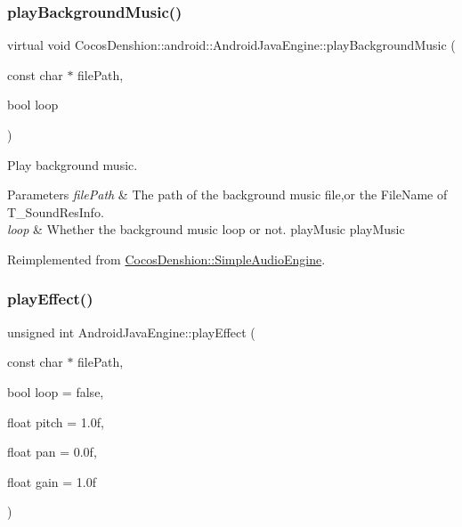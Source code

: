 \subsubsection{\texorpdfstring{play\+Background\+Music()}{playBackgroundMusic()}\hspace{0.1cm}{\footnotesize\ttfamily [2/2]}}
{\footnotesize\ttfamily virtual void Cocos\+Denshion\+::android\+::\+Android\+Java\+Engine\+::play\+Background\+Music (\begin{DoxyParamCaption}\item[{const char $\ast$}]{file\+Path,  }\item[{bool}]{loop }\end{DoxyParamCaption})\hspace{0.3cm}{\ttfamily [virtual]}}

Play background music.


\begin{DoxyParams}{Parameters}
{\em file\+Path} & The path of the background music file,or the File\+Name of T\+\_\+\+Sound\+Res\+Info. \\
\hline
{\em loop} & Whether the background music loop or not.  play\+Music  play\+Music \\
\hline
\end{DoxyParams}


Reimplemented from \hyperlink{classCocosDenshion_1_1SimpleAudioEngine_a579246d2298b943adf49a2c4faaf25ea}{Cocos\+Denshion\+::\+Simple\+Audio\+Engine}.

\mbox{\label{classCocosDenshion_1_1android_1_1AndroidJavaEngine_afbff85587cb49beee14ea5814209ca58}} 
\subsubsection{\texorpdfstring{play\+Effect()}{playEffect()}\hspace{0.1cm}{\footnotesize\ttfamily [1/2]}}
{\footnotesize\ttfamily unsigned int Android\+Java\+Engine\+::play\+Effect (\begin{DoxyParamCaption}\item[{const char $\ast$}]{file\+Path,  }\item[{bool}]{loop = {\ttfamily false},  }\item[{float}]{pitch = {\ttfamily 1.0f},  }\item[{float}]{pan = {\ttfamily 0.0f},  }\item[{float}]{gain = {\ttfamily 1.0f} }\end{DoxyParamCaption})\hspace{0.3cm}{\ttfamily [virtual]}}

